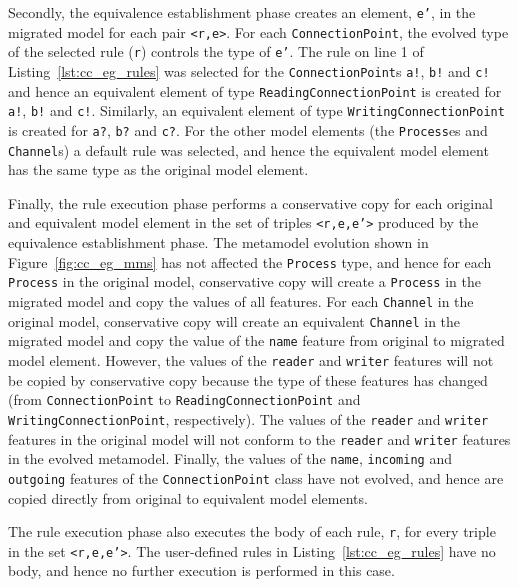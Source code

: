 Secondly, the equivalence establishment phase creates an element, \texttt{e'}, in the migrated model for each pair \texttt{<r,e>}. For each \texttt{ConnectionPoint}, the evolved type of the selected rule (\texttt{r}) controls the type of \texttt{e'}. The rule on line 1 of Listing~\ref{lst:cc_eg_rules} was selected for the \texttt{ConnectionPoint}s \texttt{a!}, \texttt{b!} and \texttt{c!} and hence an equivalent element of type \texttt{ReadingConnectionPoint} is created for \texttt{a!}, \texttt{b!} and \texttt{c!}. Similarly, an equivalent element of type \texttt{WritingConnectionPoint} is created for \texttt{a?}, \texttt{b?} and \texttt{c?}. For the other model elements (the \texttt{Process}es and \texttt{Channel}s) a default rule was selected, and hence the equivalent model element has the same type as the original model element.

Finally, the rule execution phase performs a conservative copy for each original and equivalent model element in the set of triples \texttt{<r,e,e'>} produced by the equivalence establishment phase. The metamodel evolution shown in Figure~\ref{fig:cc_eg_mms} has not affected the \texttt{Pr\-oc\-e\-ss} type, and hence for each \texttt{Pr\-oc\-e\-ss} in the original model, conservative copy will create a \texttt{Pr\-oc\-e\-ss} in the migrated model and copy the values of all features. For each \texttt{Ch\-an\-n\-el} in the original model, conservative copy will create an equivalent \texttt{Ch\-an\-n\-el} in the migrated model and copy the value of the \texttt{na\-me} feature from original to migrated model element. However, the values of the \texttt{re\-ad\-er} and \texttt{wr\-it\-er} features will not be copied by conservative copy because the type of these features has changed (from \texttt{Co\-nn\-ec\-ti\-o\-nP\-oi\-nt} to \texttt{Re\-a\-di\-ngCo\-nn\-ec\-ti\-o\-nP\-oi\-nt} and \texttt{Wr\-i\-ti\-ngCo\-nn\-ec\-ti\-o\-nP\-oi\-nt}, respectively). The values of the \texttt{re\-ad\-er} and \texttt{wr\-it\-er} features in the original model will not conform to the \texttt{re\-ad\-er} and \texttt{wr\-it\-er} features in the evolved metamodel. Finally, the values of the \texttt{na\-me}, \texttt{in\-co\-mi\-ng} and \texttt{ou\-tg\-oi\-ng} features of the \texttt{Co\-nn\-ec\-ti\-o\-nP\-oi\-nt} class have not evolved, and hence are copied directly from original to equivalent model elements.

The rule execution phase also executes the body of each rule, \texttt{r}, for every triple in the set \texttt{<r,e,e'>}. The user-defined rules in Listing~\ref{lst:cc_eg_rules} have no body, and hence no further execution is performed in this case.

